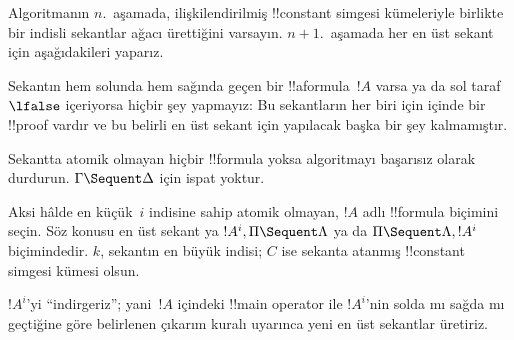 \documentclass[../../../include/open-logic-section]{subfiles}
\begin{document}
Algoritmanın $n$.~aşamada, ilişkilendirilmiş !!{constant} simgesi kümeleriyle
birlikte bir indisli sekantlar ağacı ürettiğini varsayın. $n+1$.~aşamada her
en üst sekant için aşağıdakileri yaparız.

Sekantın hem solunda hem sağında geçen bir !!a{formula}~$!A$ varsa ya da
sol taraf~$\lfalse$ içeriyorsa hiçbir şey yapmayız: Bu sekantların her biri
için  içinde bir !!{proof} vardır ve bu belirli en üst sekant için yapılacak
başka bir şey kalmamıştır.

Sekantta atomik olmayan hiçbir !!{formula} yoksa algoritmayı başarısız olarak
durdurun. $\Gamma \Sequent \Delta$ için ispat yoktur.

Aksi hâlde en küçük~$i$ indisine sahip atomik olmayan, $!A$ adlı !!{formula} biçimini
seçin. Söz konusu en üst sekant ya $!A^i, \Pi \Sequent \Lambda$ ya da
$\Pi \Sequent \Lambda, !A^i$ biçimindedir. $k$, sekantın en büyük indisi;
$C$ ise sekanta atanmış !!{constant} simgesi kümesi olsun.

$!A^i$'yi ``indirgeriz''; yani~$!A$ içindeki !!{main operator} ile $!A^i$'nin
solda mı sağda mı geçtiğine göre belirlenen çıkarım kuralı uyarınca yeni en
üst sekantlar üretiriz.
\end{document}
